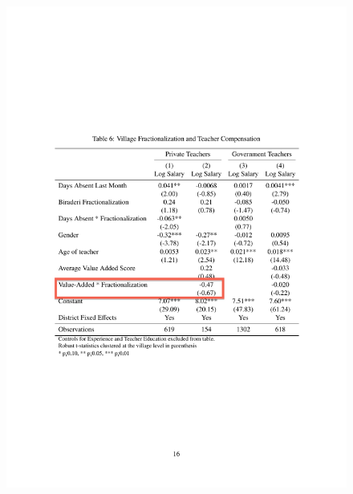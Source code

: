 \documentclass{beamer}
\begin{document}
\begin{frame}{}
\begin{figure}[htb]
	\begin{center}
	\includegraphics[scale=0.65]{tables/frac_and_compensation_box2.pdf}
	\end{center}
\end{figure}
\end{frame}
\end{document}
